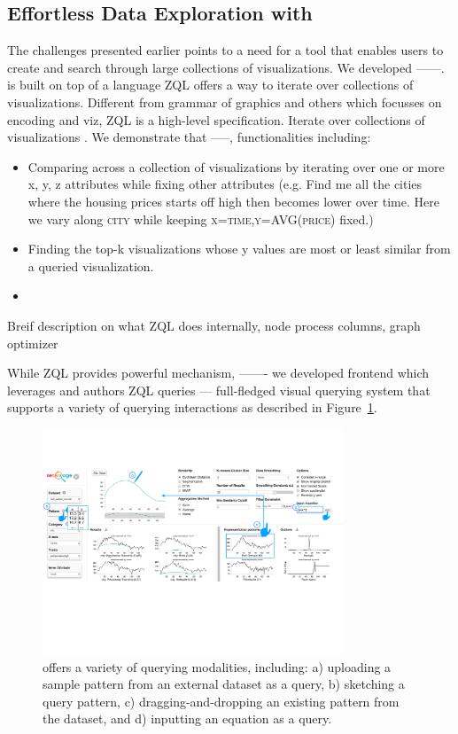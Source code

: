 \subsection{Effortless Data Exploration with \zv}
\par The challenges presented earlier points to a need for a tool that enables users to create and search through large collections of visualizations. We developed \zv ------. \zv is built on top of a language ZQL offers a way to iterate over collections of visualizations. Different from grammar of graphics and others which focusses on encoding and viz\cite{Wongsuphasawat2016}, ZQL is a high-level specification. Iterate over collections of visualizations \cite{Siddiqui}. We demonstrate that -----, functionalities including: 
\begin{itemize}
	\item Comparing across a collection of visualizations by iterating over one or more x, y, z attributes while fixing other attributes (e.g. Find me all the cities where the housing prices starts off high then becomes lower over time. Here we vary along \textsc{city} while keeping \textsc{x=time,y=AVG(price)} fixed.)
	\item Finding the top-k visualizations whose y values are most or least similar from a queried visualization. 
	\item 
\end{itemize}
\par Breif description on what ZQL does internally, node process columns, graph optimizer

\par While ZQL provides powerful mechanism, ------- we developed \zv frontend which leverages and authors ZQL queries --- full-fledged visual querying system that supports a variety of querying interactions as described in Figure~\ref{fig:modalities}. 

\begin{figure}[h!]
\label{fig:modalities}
\centering
\includegraphics[width=0.8\textwidth]{figures/modalities.pdf}
\caption{\zv offers a variety of querying modalities, including: a) uploading a sample pattern from an external dataset as a query, b) sketching a query pattern, c) dragging-and-dropping an existing pattern from the dataset, and d) inputting an equation as a query.}
\end{figure}

